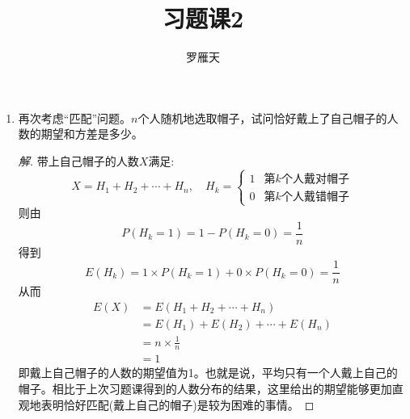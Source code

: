 \documentclass[12pt]{article}
\newcommand{\hei}{\CJKfamily{hei}}                          %
\begin{document}
\author{罗雁天}
\title{习题课2}
\maketitle

\medskip

\begin{enumerate}

\item {\hei 再次考虑“匹配”问题。$n$个人随机地选取帽子，试问恰好戴上了自己帽子的人数的期望和方差是多少。}

\begin{proof}[解]
	带上自己帽子的人数$X$满足:
	\begin{equation}
	X=H_1+H_2+\cdots+H_n,\quad H_k=\left\{
	\begin{array}{cc}
	1 & \mbox{第$k$个人戴对帽子}\\
	0 & \mbox{第$k$个人戴错帽子}
	\end{array}
	\right.
	\end{equation}
	则由\begin{equation}
	P(H_k=1)=1-P(H_k=0)=\frac{1}{n}
	\end{equation}
	得到\begin{equation}
	E(H_k)=1\times P(H_k=1)+0\times P(H_k=0)=\frac{1}{n}
	\end{equation}
	从而\begin{equation}
	\begin{aligned}
	E(X)&=E(H_1+H_2+\cdots+H_n)\\
	&=E(H_1)+E(H_2)+\cdots+E(H_n) \\
	&=n\times \frac{1}{n} \\
	&=1
	\end{aligned}
	\end{equation}
	即戴上自己帽子的人数的期望值为1。也就是说，平均只有一个人戴上自己的帽子。相比于上次习题课得到的人数分布的结果，这里给出的期望能够更加直观地表明恰好匹配(戴上自己的帽子)是较为困难的事情。
	

\end{proof}
\end{enumerate}
\end{document}
